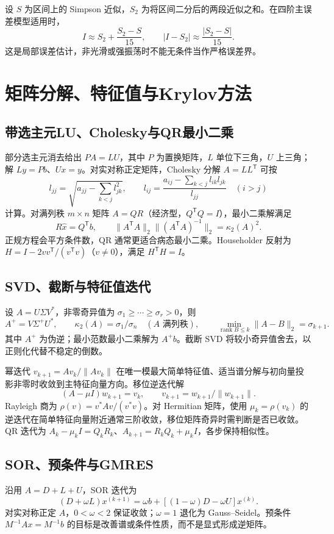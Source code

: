\documentclass[../main.tex]{subfiles}
\begin{document}
设 $S$ 为区间上的 Simpson 近似，$S_2$ 为将区间二分后的两段近似之和。在四阶主误差模型适用时，
\[
I\approx S_2+\frac{S_2-S}{15},\qquad
|I-S_2|\approx\frac{|S_2-S|}{15}.
\]
这是局部误差估计，非光滑或强振荡时不能无条件当作严格误差界。

\section{矩阵分解、特征值与Krylov方法}
\subsection{带选主元LU、Cholesky与QR最小二乘}
部分选主元消去给出 $PA=LU$，其中 $P$ 为置换矩阵，$L$ 单位下三角，$U$ 上三角；解 $Ly=Pb$、$Ux=y$。对实对称正定矩阵，Cholesky 分解 $A=LL^{\mathsf T}$ 可按
\[
l_{jj}=\sqrt{a_{jj}-\sum_{k<j}l_{jk}^2},\qquad
l_{ij}=\frac{a_{ij}-\sum_{k<j}l_{ik}l_{jk}}{l_{jj}}\quad(i>j)
\]
计算。对满列秩 $m\times n$ 矩阵 $A=QR$（经济型，$Q^{\mathsf T}Q=I$），最小二乘解满足
\[
R\widehat x=Q^{\mathsf T}b,\qquad
\|A^{\mathsf T}A\|_2\|(A^{\mathsf T}A)^{-1}\|_2=\kappa_2(A)^2.
\]
正规方程会平方条件数，QR 通常更适合病态最小二乘。Householder 反射为 $H=I-2vv^{\mathsf T}/(v^{\mathsf T}v)$（$v\ne0$），满足 $H^{\mathsf T}H=I$。

\subsection{SVD、截断与特征值迭代}
设 $A=U\Sigma V^*$，非零奇异值为 $\sigma_1\ge\cdots\ge\sigma_r>0$，则
\[
A^+=V\Sigma^+U^*,\qquad
\kappa_2(A)=\sigma_1/\sigma_n\quad(A\text{ 满列秩}),\qquad
\min_{\operatorname{rank}B\le k}\|A-B\|_2=\sigma_{k+1}.
\]
其中 $A^+$ 为伪逆；最小范数最小二乘解为 $A^+b$。截断 SVD 将较小奇异值舍去，以正则化代替不稳定的倒数。

幂迭代 $v_{k+1}=Av_k/\|Av_k\|$ 在唯一模最大简单特征值、适当谱分解与初向量投影非零时收敛到主特征向量方向。移位逆迭代解
\[
(A-\mu I)w_{k+1}=v_k,\qquad v_{k+1}=w_{k+1}/\|w_{k+1}\|.
\]
Rayleigh 商为 $\rho(v)=v^*Av/(v^*v)$。对 Hermitian 矩阵，使用 $\mu_k=\rho(v_k)$ 的逆迭代在简单特征向量附近通常三阶收敛，移位矩阵奇异时需判断是否已收敛。QR 迭代为 $A_k-\mu_kI=Q_kR_k$、$A_{k+1}=R_kQ_k+\mu_kI$，各步保持相似性。

\subsection{SOR、预条件与GMRES}
沿用 $A=D+L+U$，SOR 迭代为
\[
(D+\omega L)x^{(k+1)}=\omega b+[(1-\omega)D-\omega U]x^{(k)}.
\]
对实对称正定 $A$，$0<\omega<2$ 保证收敛；$\omega=1$ 退化为 Gauss--Seidel。预条件 $M^{-1}Ax=M^{-1}b$ 的目标是改善谱或条件性质，而不是显式形成逆矩阵。
\end{document}
